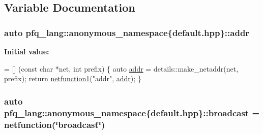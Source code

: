 \subsection{Variable Documentation}
\hypertarget{namespacepfq__lang_1_1anonymous__namespace_02default_8hpp_03_aafce8334d1be83bff9a2115439c8c453}{
\subsubsection[{addr}]{\setlength{\rightskip}{0pt plus 5cm}auto pfq\+\_\+lang\+::anonymous\+\_\+namespace\{default.\+hpp\}\+::addr}}\label{namespacepfq__lang_1_1anonymous__namespace_02default_8hpp_03_aafce8334d1be83bff9a2115439c8c453}
{\bfseries Initial value\+:}
\begin{DoxyCode}
= [] (\textcolor{keyword}{const} \textcolor{keywordtype}{char} *net, \textcolor{keywordtype}{int} prefix)
        \{
            \textcolor{keyword}{auto} \hyperlink{namespacepfq__lang_1_1anonymous__namespace_02default_8hpp_03_aafce8334d1be83bff9a2115439c8c453}{addr} = details::make\_netaddr(net, prefix);
            \textcolor{keywordflow}{return} \hyperlink{namespacepfq__lang_af215f25fa7ebd61fdc90cf0ef78a3164}{netfunction1}(\textcolor{stringliteral}{"addr"}, \hyperlink{namespacepfq__lang_1_1anonymous__namespace_02default_8hpp_03_aafce8334d1be83bff9a2115439c8c453}{addr});
        \}
\end{DoxyCode}
\hypertarget{namespacepfq__lang_1_1anonymous__namespace_02default_8hpp_03_a3b7dd001dfb2302c93212313c0bfa82a}{
\subsubsection[{broadcast}]{\setlength{\rightskip}{0pt plus 5cm}auto pfq\+\_\+lang\+::anonymous\+\_\+namespace\{default.\+hpp\}\+::broadcast = {\bf netfunction}(\char`\"{}broadcast\char`\"{})}}\label{namespacepfq__lang_1_1anonymous__namespace_02default_8hpp_03_a3b7dd001dfb2302c93212313c0bfa82a}
